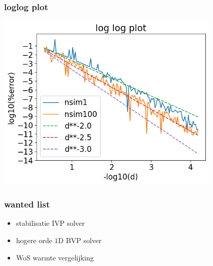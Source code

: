 \documentclass[20pt]{beamer}
\begin{document}
\begin{frame}
    \frametitle{loglog plot}
    \begin{center}
        \includegraphics[width=0.8\textwidth]{llplot.png}
    \end{center}
\end{frame}

\begin{frame}
    \frametitle{wanted list}
    \begin{itemize}
        \item stabilisatie IVP solver
        \item hogere orde $1$D BVP solver
        \item WoS warmte vergelijking
    \end{itemize}
\end{frame}
\end{document}
